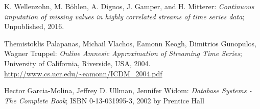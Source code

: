\documentclass[abstracton,12pt]{scrreprt}
\begin{document}
\begin{thebibliography}{99}
	
	
	 K. Wellenzohn, M. Böhlen, A. Dignos, J. Gamper, and H. Mitterer: \emph{Continuous imputation of missing values in highly correlated streams of time series data}; Unpublished, 2016.
	
	 Themistoklis Palapanas, Michail Vlachos, Eamonn Keogh, Dimitrios Gunopulos, Wagner Truppel: \emph{Online Amnesic Approximation of Streaming Time Series}; University of California, Riverside, USA, 2004. \url{http://www.cs.ucr.edu/~eamonn/ICDM_2004.pdf}

	 Hector Garcia-Molina, Jeffrey D. Ullman, Jennifer Widom: \emph{Database Systems - The Complete Book}; ISBN 0-13-031995-3, 2002 by Prentice Hall
		
	



\end{thebibliography}
\end{document}
